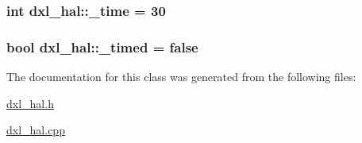 \subsubsection[{\+\_\+time}]{\setlength{\rightskip}{0pt plus 5cm}int dxl\+\_\+hal\+::\+\_\+time = 30\hspace{0.3cm}{\ttfamily [private]}}\label{classdxl__hal_ae3d8733b5ca778b070218765ca0746ac}
\hypertarget{classdxl__hal_a10d474daa3ca42b5c5ceb6558a955ca1}{}
\subsubsection[{\+\_\+timed}]{\setlength{\rightskip}{0pt plus 5cm}bool dxl\+\_\+hal\+::\+\_\+timed = false\hspace{0.3cm}{\ttfamily [private]}}\label{classdxl__hal_a10d474daa3ca42b5c5ceb6558a955ca1}


The documentation for this class was generated from the following files\+:\begin{DoxyCompactItemize}
\item 
\hyperlink{dxl__hal_8h}{dxl\+\_\+hal.\+h}\item 
\hyperlink{dxl__hal_8cpp}{dxl\+\_\+hal.\+cpp}\end{DoxyCompactItemize}
